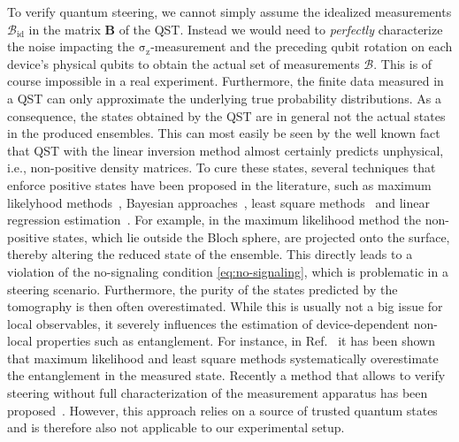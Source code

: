 \documentclass[aps,pra,twocolumn,superscriptaddress,showemail,showpacs,longbibliography]{revtex4-2}
\newcommand{\sigmaz}{\operatorname{\sigma_z}}
\begin{document}
To verify quantum steering, we cannot simply assume the idealized measurements $\mathcal{B}_\textrm{id}$ in the matrix $\mathbf{B}$ of the QST. Instead we would need to \emph{perfectly} characterize the noise impacting the $\sigmaz$-measurement and the preceding qubit rotation on each device's physical qubits to obtain the actual set of measurements $\mathcal{B}$. This is of course impossible in a real experiment. Furthermore, the finite data measured in a QST can only approximate the underlying true probability distributions. As a consequence, the states obtained by the QST are in general not the actual states in the produced ensembles. This can most easily be seen by the well known fact that QST with the linear inversion method almost certainly predicts unphysical, i.e., non-positive density matrices. 
To cure these states, several techniques that enforce positive states have been proposed in the literature, such as maximum likelyhood methods~\cite{hradilQuantumstateEstimation1997,blume-kohoutHedgedMaximumLikelihood2010,smolinEfficientMethodComputing2012}, Bayesian approaches~\cite{Blume-KohoutOptimal-reliable-estimation2010,huszarAdaptiveBayesianQuantum2012,lukensPracticalEfficientApproach2020}, least square methods~\cite{opatrnyLeastsquaresInversionDensitymatrix1997,jamesMeasurementQubits2001} and linear regression estimation~\cite{qiQuantumStateTomography2013,houFullReconstruction14qubit2016,qiAdaptiveQuantumState2017}. For example, in the maximum likelihood method the non-positive states, which lie outside the Bloch sphere, are projected onto the surface, thereby altering the reduced state of the ensemble. This directly leads to a violation of the no-signaling condition \eqref{eq:no-signaling}, which is problematic in a steering scenario. Furthermore, the purity of the states predicted by the tomography is then often overestimated. While this is usually not a big issue for local observables, it severely influences the estimation of device-dependent non-local properties such as entanglement. For instance, in Ref.~\cite{schwemmerSystematicErrorsCurrent2015} it has been shown that maximum likelihood and least square methods systematically overestimate the entanglement in the measured state. Recently a method that allows to verify steering without full characterization of the measurement apparatus has been proposed~\cite{zhaoExperimentalDemonstrationMeasurementdeviceindependent2020}. However, this approach relies on a source of trusted quantum states and is therefore also not applicable to our experimental setup. 
\end{document}
